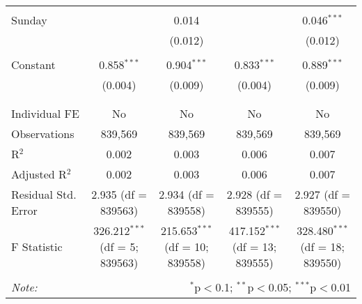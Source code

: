 \documentclass[
]{article}
\begin{document}
\begin{table}[!htbp]
{\begin{tabular}{@{\extracolsep{5pt}}lcccc}
  & & & & \\ 
 Sunday &  & 0.014 &  & 0.046$^{***}$ \\ 
  &  & (0.012) &  & (0.012) \\ 
  & & & & \\ 
 Constant & 0.858$^{***}$ & 0.904$^{***}$ & 0.833$^{***}$ & 0.889$^{***}$ \\ 
  & (0.004) & (0.009) & (0.004) & (0.009) \\ 
  & & & & \\ 
\hline \\[-1.8ex] 
Individual FE & No & No & No & No \\ 
Observations & 839,569 & 839,569 & 839,569 & 839,569 \\ 
R$^{2}$ & 0.002 & 0.003 & 0.006 & 0.007 \\ 
Adjusted R$^{2}$ & 0.002 & 0.003 & 0.006 & 0.007 \\ 
Residual Std. Error & 2.935 (df = 839563) & 2.934 (df = 839558) & 2.928 (df = 839555) & 2.927 (df = 839550) \\ 
F Statistic & 326.212$^{***}$ (df = 5; 839563) & 215.653$^{***}$ (df = 10; 839558) & 417.152$^{***}$ (df = 13; 839555) & 328.480$^{***}$ (df = 18; 839550) \\ 
\hline 
\hline \\[-1.8ex] 
\textit{Note:}  & \multicolumn{4}{r}{$^{*}$p$<$0.1; $^{**}$p$<$0.05; $^{***}$p$<$0.01} \\ 
\end{tabular}
} 
\end{table} 
\newpage
\end{document}

